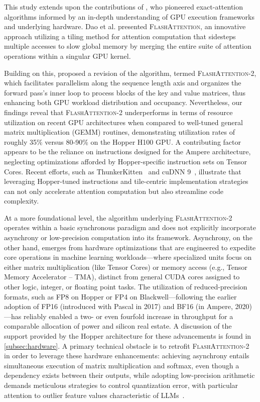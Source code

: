 This study extends upon the contributions of \citet{dao2022flashattention}, who pioneered exact-attention algorithms informed by an in-depth understanding of GPU execution frameworks and underlying hardware. Dao et al. presented \textsc{FlashAttention}, an innovative approach utilizing a tiling method for attention computation that sidesteps multiple accesses to slow global memory by merging the entire suite of attention operations within a singular GPU kernel.

Building on this, \citet{dao2023flashattention2} proposed a revision of the algorithm, termed \textsc{FlashAttention-2}, which facilitates parallelism along the sequence length axis and organizes the forward pass's inner loop to process blocks of the key and value matrices, thus enhancing both GPU workload distribution and occupancy. Nevertheless, our findings reveal that \textsc{FlashAttention-2} underperforms in terms of resource utilization on recent GPU architectures when compared to well-tuned general matrix multiplication (GEMM) routines, demonstrating utilization rates of roughly 35\% versus 80-90\% on the Hopper H100 GPU. A contributing factor appears to be the reliance on instructions designed for the Ampere architecture, neglecting optimizations afforded by Hopper-specific instruction sets on Tensor Cores. Recent efforts, such as ThunkerKitten~\citep{spector2024thunder} and cuDNN 9~\citep{cudnn9}, illustrate that leveraging Hopper-tuned instructions and tile-centric implementation strategies can not only accelerate attention computation but also streamline code complexity.

At a more foundational level, the algorithm underlying \textsc{FlashAttention-2} operates within a basic synchronous paradigm and does not explicitly incorporate asynchrony or low-precision computation into its framework. Asynchrony, on the other hand, emerges from hardware optimizations that are engineered to expedite core operations in machine learning workloads—where specialized units focus on either matrix multiplication (like Tensor Cores) or memory access (e.g., Tensor Memory Accelerator -- TMA), distinct from general CUDA cores assigned to other logic, integer, or floating point tasks. The utilization of reduced-precision formats, such as FP8 on Hopper or FP4 on Blackwell—following the earlier adoption of FP16 (introduced with Pascal in 2017) and BF16 (in Ampere, 2020)—has reliably enabled a two- or even fourfold increase in throughput for a comparable allocation of power and silicon real estate. A discussion of the support provided by the Hopper architecture for these advancements is found in \cref{subsec:hardware}. A primary technical obstacle is to retrofit \textsc{FlashAttention-2} in order to leverage these hardware enhancements: achieving asynchrony entails simultaneous execution of matrix multiplication and softmax, even though a dependency exists between their outputs, while adopting low-precision arithmetic demands meticulous strategies to control quantization error, with particular attention to outlier feature values characteristic of LLMs~\citep{dettmers2208llm, sun2024massive}.

